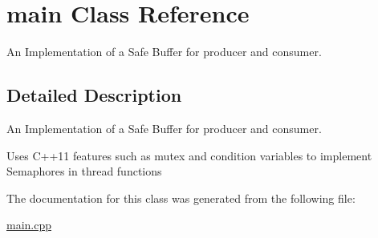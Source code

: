 \hypertarget{classmain}{}\section{main Class Reference}
\label{classmain}


An Implementation of a Safe Buffer for producer and consumer.  




\subsection{Detailed Description}
An Implementation of a Safe Buffer for producer and consumer. 

Uses C++11 features such as mutex and condition variables to implement Semaphores in thread functions 

The documentation for this class was generated from the following file\+:\begin{DoxyCompactItemize}
\item 
\hyperlink{main_8cpp}{main.\+cpp}\end{DoxyCompactItemize}
